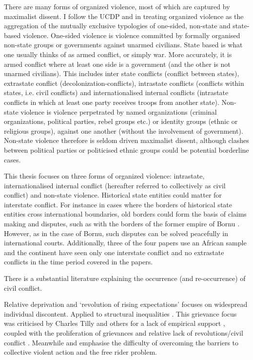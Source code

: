 \documentclass[12pt]{article}
\begin{document}
There are many forms of organized violence, most of which are captured by
maximalist dissent. I follow the UCDP and \citet{Melander_2016} in treating
organized violence as the aggregation of the mutually exclusive typologies of
one-sided, non-state and state-based violence. One-sided violence is violence
committed by formally organised non-state groups or governments against unarmed
civilians. State based is what one usually thinks of as armed conflict, or
simply war. More accurately, it is armed conflict where at least one side is a
government (and the other is not unarmed civilians). This includes inter state
conflicts (conflict between states), extrastate conflict
(decolonization-conflicts), intrastate conflicts (conflicts within states, i.e.
civil conflicts) and internationalised internal conflicts (intrastate conflicts
in which at least one party receives troops from another state). Non-state
violence is violence perpetrated by named organizations (criminal organizations,
political parties, rebel groups etc.) or identity groups (ethnic or religious
groups), against one another (without the involvement of government). Non-state
violence therefore is seldom driven maximalist dissent, although clashes between
political parties or politicised ethnic groups could be potential borderline
cases.

This thesis focuses on three forms of organized violence: intrastate,
internationalised internal conflict (hereafter referred to collectively as civil
conflict) and non-state violence. Historical state entities could matter for
interstate conflict. For instance in cases where the borders of historical state
entities cross international boundaries, old borders could form the basis of
claims making and disputes, such as with the borders of the former empire of
Bornu \citep{Hariri2012}. However, as in the case of Bornu, such disputes can be
solved peacefully in international courts. Additionally, three of the four
papers use an African sample and the continent have seen only one interstate
conflict and no extrastate conflicts in the time period covered in the papers.

There is a substantial literature explaining the occurrence (and re-occurrence)
of civil conflict. 

Relative deprivation \citep{GurrTedRobert1970Wmr} and `revolution of rising
expectations' \citep{Davies_1962} focuses on widespread individual discontent.
Applied to structural inequalities \citep{Muller_1985, Muller_1987,
ScottJamesC1977TMEo}. This grievance focus was criticised by Charles Tilly and
others for a lack of empirical support \citep{Oberschall_1978, Brush_1996},
coupled with the proliferation of grievances and relative lack of
revolutions/civil conflict \citep{Snyder_1972, TillyCharles1978Fmtr,
Skocpol_1979}. Meanwhile \citet{OlsonMancur1965TLoC} and \citet{Tullock_1971}
emphasise the difficulty of overcoming the barriers to collective violent action
and the free rider problem.
\end{document}
